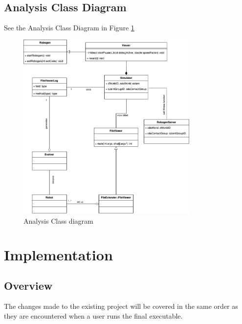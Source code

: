 \documentclass[11pt,a4paper]{article}
\begin{document}
\subsection{Analysis Class Diagram}
See the Analysis Class Diagram in Figure \ref{fig:analysis-class-diagram}

\begin{figure}[htpb]
    \centering
    \includegraphics[width=0.8\textwidth]{1}
    \caption{Analysis Class diagram}
    \label{fig:analysis-class-diagram}
\end{figure}

\section{Implementation}


\subsection{Overview}
The changes made to the existing project will be covered in the same order as
they are encountered when a user runs the final executable.
\end{document}
